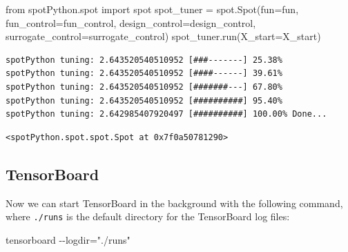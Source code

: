 \documentclass[
  letterpaper,
  DIV=11,
  numbers=noendperiod]{scrreprt}
\newenvironment{Shaded}{\begin{snugshade}}{\end{snugshade}}
\newcommand{\ImportTok}[1]{\textcolor[rgb]{0.00,0.46,0.62}{#1}}
\newcommand{\NormalTok}[1]{\textcolor[rgb]{0.00,0.23,0.31}{#1}}
\newcommand{\OperatorTok}[1]{\textcolor[rgb]{0.37,0.37,0.37}{#1}}
\begin{document}
\begin{Shaded}
\begin{Highlighting}[]
\ImportTok{from}\NormalTok{ spotPython.spot }\ImportTok{import}\NormalTok{ spot}
\NormalTok{spot\_tuner }\OperatorTok{=}\NormalTok{ spot.Spot(fun}\OperatorTok{=}\NormalTok{fun,}
\NormalTok{                   fun\_control}\OperatorTok{=}\NormalTok{fun\_control,}
\NormalTok{                   design\_control}\OperatorTok{=}\NormalTok{design\_control,}
\NormalTok{                   surrogate\_control}\OperatorTok{=}\NormalTok{surrogate\_control)}
\NormalTok{spot\_tuner.run(X\_start}\OperatorTok{=}\NormalTok{X\_start)}
\end{Highlighting}
\end{Shaded}

\begin{verbatim}
spotPython tuning: 2.643520540510952 [###-------] 25.38% 
spotPython tuning: 2.643520540510952 [####------] 39.61% 
spotPython tuning: 2.643520540510952 [#######---] 67.80% 
spotPython tuning: 2.643520540510952 [##########] 95.40% 
spotPython tuning: 2.642985407920497 [##########] 100.00% Done...
\end{verbatim}

\begin{verbatim}
<spotPython.spot.spot.Spot at 0x7f0a50781290>
\end{verbatim}

\subsection{TensorBoard}\label{sec-tensorboard-10}

Now we can start TensorBoard in the background with the following
command, where \texttt{./runs} is the default directory for the
TensorBoard log files:

\begin{Shaded}
\begin{Highlighting}[]
\NormalTok{tensorboard {-}{-}logdir="./runs"}
\end{Highlighting}
\end{Shaded}
\end{document}
